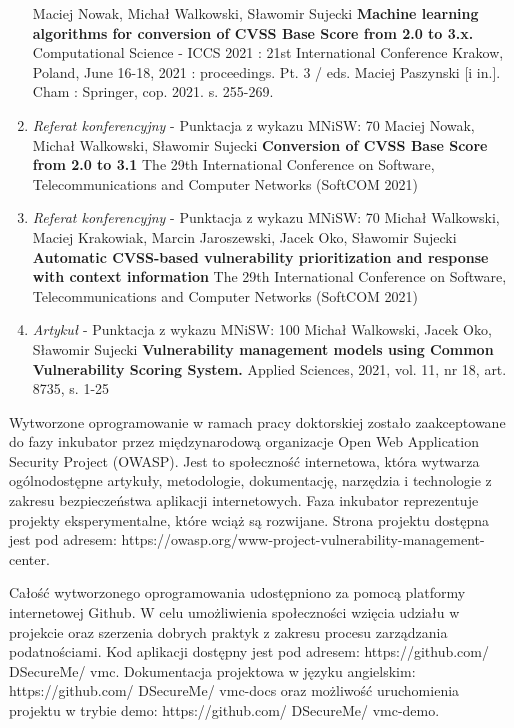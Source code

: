 \begin{enumerate}
{    Maciej Nowak, Michał Walkowski, Sławomir Sujecki\newline
    \textbf{Machine learning algorithms for conversion of CVSS Base Score from 2.0 to 3.x.}\newline
    Computational Science - ICCS 2021 : 21st International Conference Krakow, Poland, June 16-18, 2021 : proceedings. Pt. 3 / eds. Maciej Paszynski [i in.]. Cham : Springer, cop. 2021. s. 255-269.}
    \item {\emph{Referat konferencyjny} - Punktacja z wykazu MNiSW: 70\newline
    Maciej Nowak, Michał Walkowski, Sławomir Sujecki\newline
    \textbf{Conversion of {CVSS} Base Score from 2.0 to 3.1}\newline
    The 29th International Conference on Software, Telecommunications and Computer Networks (SoftCOM 2021)}
    \item{\emph{Referat konferencyjny} - Punktacja z wykazu MNiSW: 70\newline
    Michał Walkowski, Maciej Krakowiak, Marcin Jaroszewski, Jacek Oko, Sławomir Sujecki\newline
    \textbf{Automatic {CVSS-based} vulnerability prioritization and response with context information}\newline
    The 29th International Conference on Software, Telecommunications and Computer Networks (SoftCOM 2021)}
    \item {\emph{Artykuł} - Punktacja z wykazu MNiSW: 100\newline
    Michał Walkowski, Jacek Oko, Sławomir Sujecki\newline
    \textbf{Vulnerability management models using Common Vulnerability Scoring System.}\newline
    Applied Sciences, 2021, vol. 11, nr 18, art. 8735, s. 1-25}
\end{enumerate}

\bigbreak
Wytworzone oprogramowanie w ramach pracy doktorskiej zostało zaakceptowane do fazy inkubator przez międzynarodową organizacje Open Web Application Security Project (OWASP). Jest to społeczność internetowa, która wytwarza ogólnodostępne artykuły, metodologie, dokumentację, narzędzia i technologie z zakresu bezpieczeństwa aplikacji internetowych. Faza inkubator reprezentuje projekty eksperymentalne, które wciąż są rozwijane. Strona projektu dostępna jest pod adresem: https://owasp.org/www-project-vulnerability-management-center.

\bigbreak
Całość wytworzonego oprogramowania udostępniono za pomocą platformy internetowej Github. W celu umożliwienia społeczności wzięcia udziału w projekcie oraz szerzenia dobrych praktyk z zakresu procesu zarządzania podatnościami. Kod aplikacji dostępny jest pod adresem: https://github.com/ DSecureMe/ vmc. Dokumentacja projektowa w języku angielskim: https://github.com/ DSecureMe/ vmc-docs oraz możliwość uruchomienia projektu w trybie demo: https://github.com/ DSecureMe/ vmc-demo.

